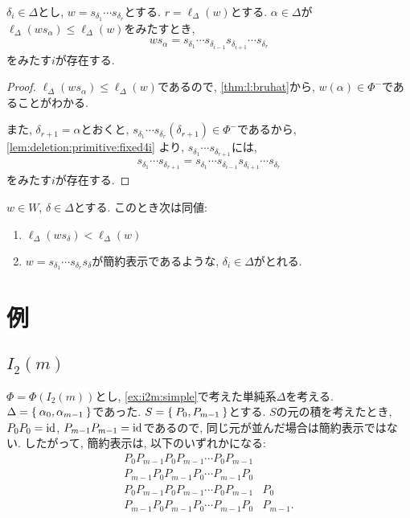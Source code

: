 \begin{prop}
  $\delta_i\in \Delta$とし, $w=s_{\delta_1}\cdots s_{\delta_r}$とする.
  $r=\ell_\Delta(w)$とする.
  $\alpha\in \Delta$が$\ell_\Delta(ws_\alpha)\leq \ell_\Delta(w)$をみたすとき,
  \begin{align*}
    ws_\alpha=s_{\delta_1}\cdots s_{\delta_{i-1}}s_{\delta_{i+1}}\cdots s_{\delta_{r}}
  \end{align*}
  をみたす$i$が存在する.
\end{prop}
\begin{proof}
  $\ell_\Delta(ws_\alpha)\leq \ell_\Delta(w)$であるので,
  \cref{thm:l:bruhat}から, $w(\alpha)\in\Phi^-$であることがわかる.

  また, $\delta_{r+1}=\alpha$とおくと,
  $s_{\delta_{1}}\cdots s_{\delta_{r}}(\delta_{r+1})\in \Phi^-$であるから,
  \cref{lem:deletion:primitive:fixed4i}
  より, $s_{\delta_{1}}\cdots s_{\delta_{r+1}}$には,
  \begin{align*}
    s_{\delta_{1}}\cdots s_{\delta_{r+1}}
    =s_{\delta_{1}}\cdots s_{\delta_{i-1}}
    s_{\delta_{i+1}}\cdots s_{\delta_{r}}
  \end{align*}
  をみたす$i$が存在する.
\end{proof}

\begin{cor}
$w\in W$, $\delta\in\Delta$とする.
  このとき次は同値:
  \begin{enumerate}
  \item $\ell_\Delta(ws_\delta)<\ell_\Delta(w)$
  \item $w=s_{\delta_1}\cdots s_{\delta_r}s_\delta$が簡約表示であるような,
    $\delta_i\in \Delta$がとれる.
  \end{enumerate}
\end{cor}


\section{例}
\subsection{$I_2(m)$}
$\Phi=\Phi(I_2(m))$とし,
\cref{ex:i2m:simple}で考えた単純系$\Delta$を考える.
$\Delta=\Set{\alpha_0,\alpha_{m-1}}$であった.
$S=\Set{P_0,P_{m-1}}$とする.
$S$の元の積を考えたとき,
$P_0P_0=\operatorname{id}$,
$P_{m-1}P_{m-1}=\operatorname{id}$であるので,
同じ元が並んだ場合は簡約表示ではない.
したがって,
簡約表示は,
以下のいずれかになる:
\begin{align*}
P_0P_{m-1}P_0P_{m-1}\cdots P_0P_{m-1}&\\
P_{m-1}P_0P_{m-1}P_0\cdots P_{m-1}P_0&\\
P_0P_{m-1}P_0P_{m-1}\cdots P_0P_{m-1}&P_0\\
P_{m-1}P_0P_{m-1}P_0\cdots P_{m-1}P_0&P_{m-1}.
\end{align*}

